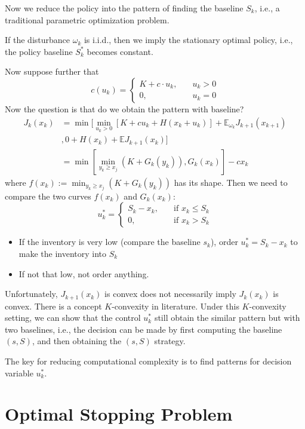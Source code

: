 Now we reduce the policy into the pattern of finding the baseline $S_k$, i.e., a traditional parametric optimization problem.
\begin{proposition}
If the disturbance $\omega_k$ is i.i.d., then we imply the stationary optimal policy, i.e., the policy baseline $S_k^*$ becomes constant.
\end{proposition}

Now suppose further that 
\[
c(u_k)
=
\left\{
\begin{aligned}
K+c\cdot u_k,&\quad u_k>0\\
0,&\quad u_k=0
\end{aligned}
\right.
\]
Now the question is that do we obtain the pattern with baseline?
\begin{align*}
J_k(x_k)
&=
\min
[
\min_{u_k>0}
[K+cu_k+H(x_k+u_k)]+\mathbb{E}_{\omega_k}J_{k+1}(x_{k+1})\\
&,
0+H(x_k)+\mathbb{E}J_{k+1}(x_k)]\\
&=\min
\left[
\min_{y_k\ge x_j}(K+G_k(y_k)), G_k(x_k)
\right] - cx_k
\end{align*}
where $f(x_k):=\min_{y_k\ge x_j}(K+G_k(y_k))$ has its shape. Then we need to compare the two curves $f(x_k)$ and $G_k(x_k)$:
\[
u_k^*
=
\left\{
\begin{aligned}
S_k-x_k,&\quad\text{if }x_k\le S_k\\
0,&\quad\text{if }x_k>S_k
\end{aligned}
\right.
\]
\begin{itemize}
\item
If the inventory is very low (compare the baseline $s_k$), order $u_k^*=S_k-x_k$ to make the inventory into $S_k$
\item
If not that low, not order anything.
\end{itemize}
\begin{remark}
Unfortunately, $J_{k+1}(x_k)$ is convex does not necessarily imply $J_k(x_k)$ is convex. There is a concept $K$-convexity in literature. Under this $K$-convexity setting, we can show that the control $u_k^*$ still obtain the similar pattern but with two baselines, i.e., the decision can be made by first computing the baseline $(s,S)$, and then obtaining the $(s,S)$ strategy.
\end{remark}

The key for reducing computational complexity is to find patterns for decision variable $u_k^*$.

\section{Optimal Stopping Problem}
